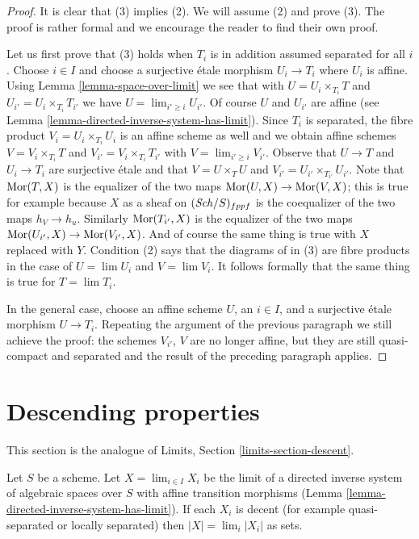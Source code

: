 \begin{proof}
It is clear that (3) implies (2). We will assume (2) and prove (3).
The proof is rather formal and we encourage the reader to find their
own proof.

\medskip\noindent
Let us first prove that (3) holds
when $T_i$ is in addition assumed separated for all $i$.
Choose $i \in I$ and choose a surjective \'etale morphism $U_i \to T_i$
where $U_i$ is affine. Using Lemma \ref{lemma-space-over-limit}
we see that with $U = U_i \times_{T_i} T$ and
$U_{i'} = U_i \times_{T_i} T_{i'}$ we have $U = \lim_{i' \geq i} U_{i'}$.
Of course $U$ and $U_{i'}$ are affine (see
Lemma \ref{lemma-directed-inverse-system-has-limit}).
Since $T_i$ is separated, the fibre product $V_i = U_i \times_{T_i} U_i$
is an affine scheme as well and we obtain affine schemes
$V = V_i \times_{T_i} T$ and
$V_{i'} = V_i \times_{T_i} T_{i'}$ with $V = \lim_{i' \geq i} V_{i'}$.
Observe that $U \to T$ and $U_i \to T_i$ are surjective \'etale and
that $V = U \times_T U$ and $V_{i'} = U_{i'} \times_{T_{i'}} U_{i'}$.
Note that $\mathop{\mathrm{Mor}}\nolimits(T, X)$ is the equalizer of the two maps
$\mathop{\mathrm{Mor}}\nolimits(U, X) \to \mathop{\mathrm{Mor}}\nolimits(V, X)$; this is true for example because
$X$ as a sheaf on $(\mathit{Sch}/S)_{fppf}$ is the coequalizer
of the two maps $h_V \to h_u$. Similarly
$\mathop{\mathrm{Mor}}\nolimits(T_{i'}, X)$ is the equalizer of the
two maps $\mathop{\mathrm{Mor}}\nolimits(U_{i'}, X) \to \mathop{\mathrm{Mor}}\nolimits(V_{i'}, X)$.
And of course the same thing is true with $X$ replaced with $Y$.
Condition (2) says that the diagrams of in (3) are fibre products
in the case of $U = \lim U_i$ and $V = \lim V_i$.
It follows formally that the same thing is true for $T = \lim T_i$.

\medskip\noindent
In the general case, choose an affine scheme $U$, an $i \in I$,
and a surjective \'etale morphism $U \to T_i$. Repeating the
argument of the previous paragraph we still achieve the proof:
the schemes $V_{i'}$, $V$ are no longer affine, but they are
still quasi-compact and
separated and the result of the preceding paragraph applies.
\end{proof}




\section{Descending properties}
\label{section-descent}

\noindent
This section is the analogue of Limits, Section \ref{limits-section-descent}.

\begin{lemma}
\label{lemma-inverse-limit-sets}
Let $S$ be a scheme. Let $X = \lim_{i \in I} X_i$ be the limit of a directed
inverse system of algebraic spaces over $S$ with affine transition morphisms
(Lemma \ref{lemma-directed-inverse-system-has-limit}). If each $X_i$
is decent (for example quasi-separated or locally separated)
then $|X| = \lim_i |X_i|$ as sets.
\end{lemma}

